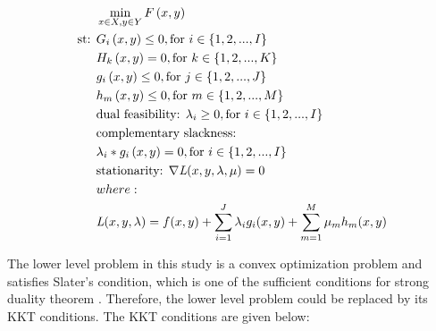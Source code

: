 \begin{align}
&\operatorname*{min}_{x\in X, y\in Y}F\left(x,y\right)\nonumber\\
\text{st:  } & G_i\left(x,y\right)\leq 0, \text{for   }  i \in \{1,2,...,I\}\nonumber\\
& H_k\left(x,y\right)= 0, \text{for   }  k \in \{1,2,...,K\}\nonumber\\
&g_i\left(x,y\right)\leq 0, \text{for   }  j \in \{1,2,...,J\}\nonumber\\
&h_m\left(x,y\right)\leq 0, \text{for   }  m \in \{1,2,...,M\}\nonumber\\
&\text{dual feasibility: }\lambda_i\geq 0, \text{for   }  i \in \{1,2,...,I\}\nonumber\\
&\text{complementary slackness: }\nonumber \\
&\lambda_i*g_i\left(x,y\right)= 0, \text{for   }  i \in \{1,2,...,I\}\nonumber\\ 
&\text{stationarity: }\nabla \textit{L}(x,y,\lambda,\mu)=0\nonumber\\ 
& where:\nonumber\\ 
 &  \textit{L}(x,y,\lambda)=f(x,y)+\sum_{i=1}^{J}\lambda _ig_i(x,y)+\sum_{m=1}^{M}\mu _mh_m(x,y)\nonumber
\end{align}


The lower level problem in this study is a convex optimization problem and satisfies Slater's condition, which is one of the sufficient conditions for strong duality theorem \cite{convex}. Therefore, the lower level problem could be replaced by its KKT conditions. The KKT conditions are given below:\\

